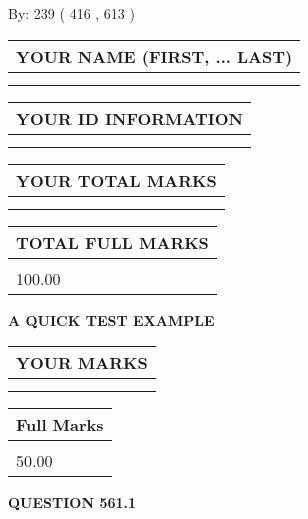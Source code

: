 \documentclass[12pt]{article}
\begin{document}
   
\hspace{1.0in} By: 
 239 ( 416 ,  613 )
   
   
   
   
\newpage 
\setcounter{page}{ 
   561001 } 
   
   
   
   
\noindent\begin{tabular}{|l|}
\hline
YOUR NAME (FIRST, ... LAST)  \\
\hline
 \\ 
 \\ 
\hline
\end{tabular}
\hspace{0.05in} \begin{tabular}{|l|}
\hline
 YOUR   ID   INFORMATION  \\
\hline
 \\ 
 \\ 
\hline
\end{tabular}
   
   
\vspace{0.2in}\noindent\begin{tabular}{|l|}
\hline
YOUR TOTAL MARKS  \\
\hline
 \\ 
 \\ 
\hline
\end{tabular}
\hspace{0.05in} \begin{tabular}{|l|}
\hline
TOTAL FULL MARKS  \\
\hline
 \\ 
100.00 \\
\hline
\end{tabular}
   
   
 \vspace{0.2in}
{\LARGE {\textbf{ A QUICK TEST EXAMPLE}}}
   
   
  
\vspace{0.2in}
  
\noindent\begin{tabular}{|l|}
\hline
 YOUR MARKS  \\
\hline
 \\ 
 \\ 
\hline
\end{tabular}
\hspace{0.05in} \begin{tabular}{|l|}
\hline
 Full Marks  \\
\hline
 \\ 
50.00 \\
\hline
\end{tabular}
{\textbf{\Large{QUESTION
561.1 
}}}
  
\end{document}

